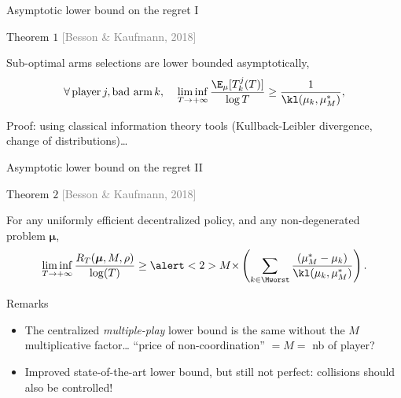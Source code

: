 \documentclass[12pt,english,ignorenonframetext,aspectratio=169,]{beamer}
\providecommand{\tightlist}{%
  \setlength{\itemsep}{0pt}\setlength{\parskip}{0pt}}
\begin{document}
\begin{frame}{Asymptotic lower bound on the regret I}

\begin{block}{Theorem $1$
  \hfill{}\textcolor{gray}{[Besson \& Kaufmann, 2018]}}

  Sub-optimal arms selections are lower bounded asymptotically,
  \[\forall\, \text{player}\, j, \text{bad arm}\,k,\;\;\;\; \mathop{\lim\inf}\limits_{T \to +\infty} \frac{\E_{\mu}[T_k^j(T)]}{\log T} \geq \frac{1}{\kl(\mu_k, \mu_M^*)},\]
\end{block}

Proof: using classical information theory tools (Kullback-Leibler divergence, change of distributions)\dots
{}

\end{frame}

\begin{frame}{Asymptotic lower bound on the regret II}

\begin{block}{Theorem $2$
\hfill{}\textcolor{gray}{[Besson \& Kaufmann, 2018]}}

\small{For any uniformly efficient decentralized policy, and any
non-degenerated problem \(\boldsymbol{\mu}\),} \vspace*{-10pt}
\[ \mathop{\lim\inf}\limits_{T \to +\infty} \frac{R_T(\boldsymbol{\mu}, M, \rho)}{\log(T)} \geq
\alert<2>{M \times} \left( \sum_{k \in \Mworst} \frac{(\mu_M^* -  \mu_k)}{\kl(\mu_k, \mu_M^*)} \right) . \]
\end{block}

\pause

\begin{block}{Remarks}

\begin{itemize}\tightlist
\item
  The centralized \emph{multiple-play} lower bound is the same without
  the \alert{\(M\) multiplicative factor}\ldots{}
  \hook \alert{``price of non-coordination''} \(= M =\) nb of player?
\item
  Improved state-of-the-art lower bound, but still not perfect:
  collisions should also be controlled!
\end{itemize}

\end{block}

\end{frame}
\end{document}
